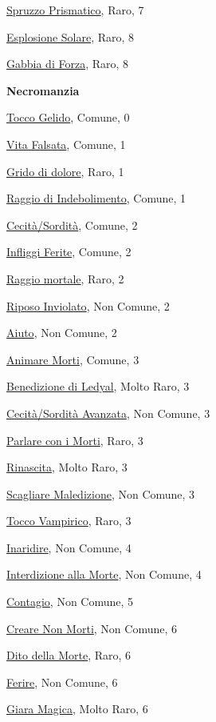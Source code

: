 \begin{multicols}{3}
{{\hyperlink{Spruzzo Prismatico}{Spruzzo Prismatico}, Raro, 7

\hyperlink{Esplosione Solare}{Esplosione Solare}, Raro, 8

\hyperlink{Gabbia di Forza}{Gabbia di Forza}, Raro, 8

\medskip\textbf{Necromanzia}

\hyperlink{Tocco Gelido}{Tocco Gelido}, Comune, 0

\hyperlink{Vita Falsata}{Vita Falsata}, Comune, 1

\hyperlink{Grido di dolore}{Grido di dolore}, Raro, 1

\hyperlink{Raggio di Indebolimento}{Raggio di Indebolimento}, Comune, 1

\hyperlink{Cecità/Sordità}{Cecità/Sordità}, Comune, 2

\hyperlink{Infliggi Ferite}{Infliggi Ferite}, Comune, 2

\hyperlink{Raggio mortale}{Raggio mortale}, Raro, 2

\hyperlink{Riposo Inviolato}{Riposo Inviolato}, Non Comune, 2

\hyperlink{Aiuto}{Aiuto}, Non Comune, 2

\hyperlink{Animare Morti}{Animare Morti}, Comune, 3

\hyperlink{Benedizione di Ledyal}{Benedizione di Ledyal}, Molto Raro, 3

\hyperlink{Cecità/Sordità Avanzata}{Cecità/Sordità Avanzata}, Non Comune, 3

\hyperlink{Parlare con i Morti}{Parlare con i Morti}, Raro, 3

\hyperlink{Rinascita}{Rinascita}, Molto Raro, 3

\hyperlink{Scagliare Maledizione}{Scagliare Maledizione}, Non Comune, 3

\hyperlink{Tocco Vampirico}{Tocco Vampirico}, Raro, 3

\hyperlink{Inaridire}{Inaridire}, Non Comune, 4

\hyperlink{Interdizione alla Morte}{Interdizione alla Morte}, Non Comune, 4

\hyperlink{Contagio}{Contagio}, Non Comune, 5

\hyperlink{Creare Non Morti}{Creare Non Morti}, Non Comune, 6

\hyperlink{Dito della Morte}{Dito della Morte}, Raro, 6

\hyperlink{Ferire}{Ferire}, Non Comune, 6

\hyperlink{Giara Magica}{Giara Magica}, Molto Raro, 6

}}
\end{multicols}
